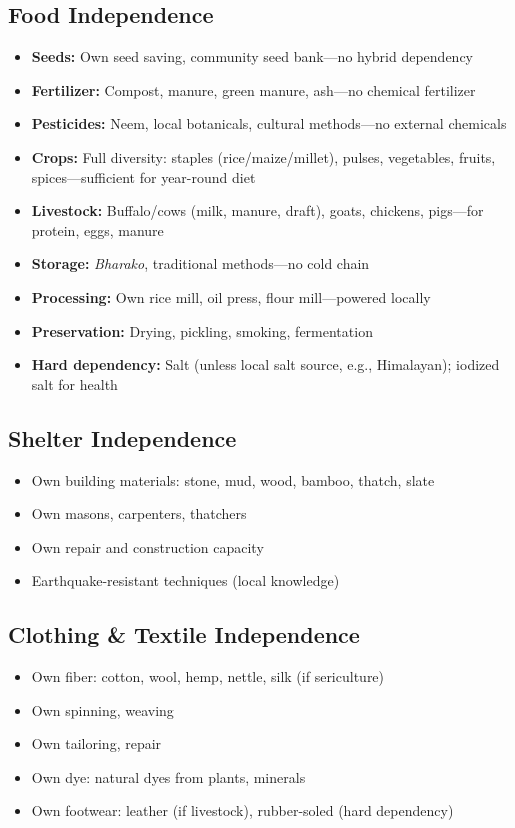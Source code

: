 \documentclass[11pt,a4paper]{article}
\begin{document}
\subsection{Food Independence}
\begin{itemize}
    \item \textbf{Seeds:} Own seed saving, community seed bank---no hybrid dependency
    \item \textbf{Fertilizer:} Compost, manure, green manure, ash---no chemical fertilizer
    \item \textbf{Pesticides:} Neem, local botanicals, cultural methods---no external chemicals
    \item \textbf{Crops:} Full diversity: staples (rice/maize/millet), pulses, vegetables, fruits, spices---sufficient for year-round diet
    \item \textbf{Livestock:} Buffalo/cows (milk, manure, draft), goats, chickens, pigs---for protein, eggs, manure
    \item \textbf{Storage:} \textit{Bharako}, traditional methods---no cold chain
    \item \textbf{Processing:} Own rice mill, oil press, flour mill---powered locally
    \item \textbf{Preservation:} Drying, pickling, smoking, fermentation
    \item \textbf{Hard dependency:} Salt (unless local salt source, e.g., Himalayan); iodized salt for health
\end{itemize}

\subsection{Shelter Independence}
\begin{itemize}
    \item Own building materials: stone, mud, wood, bamboo, thatch, slate
    \item Own masons, carpenters, thatchers
    \item Own repair and construction capacity
    \item Earthquake-resistant techniques (local knowledge)
\end{itemize}

\subsection{Clothing \& Textile Independence}
\begin{itemize}
    \item Own fiber: cotton, wool, hemp, nettle, silk (if sericulture)
    \item Own spinning, weaving
    \item Own tailoring, repair
    \item Own dye: natural dyes from plants, minerals
    \item Own footwear: leather (if livestock), rubber-soled (hard dependency)
\end{itemize}
\end{document}
